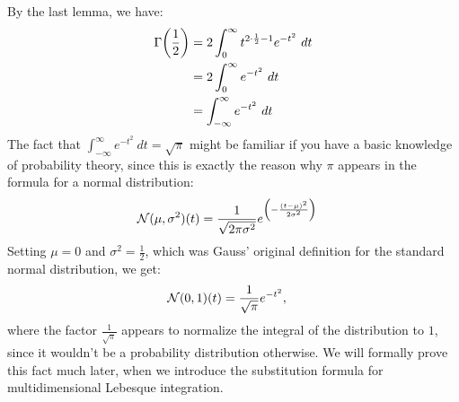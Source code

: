 \begin{proofsketch}
	By the last lemma, we have:
	\begin{align*}
		\Gamma\qty(\frac{1}{2}) &= 2\int_{0}^\infty t^{2 \cdot \frac{1}{2} - 1} e^{-t^2} ~dt\\
		&= 2\int_{0}^{\infty} e^{-t^2} ~dt\\
		&= \int_{-\infty}^{\infty} e^{-t^2} ~dt
	\end{align*}
	The fact that $\int_{-\infty}^{\infty} e^{-t^2} ~dt = \sqrt{\pi}$ might be familiar if you have a basic knowledge of probability theory, since this is exactly the reason why $\pi$ appears in the formula for a normal distribution:
	\begin{align*}
		\mathcal{N}(\mu,\sigma^2)(t)
		&=
		\frac{1}{\sqrt{2\pi\sigma^2}} e^\qty(-\frac{(t-\mu)^2}{2\sigma^2})
	\end{align*}
	Setting $\mu = 0$ and $\sigma^2 = \frac{1}{2}$, which was Gauss' original definition for the standard normal distribution, we get:
	\begin{align*}
		\mathcal{N}(0,1)(t)
		&=
		\frac{1}{\sqrt{\pi}} e^{-t^2},
	\end{align*}
	where the factor $\frac{1}{\sqrt{\pi}}$ appears to normalize the integral of the distribution to $1$, since it wouldn't be a probability distribution otherwise.
	\newpar
	We will formally prove this fact much later, when we introduce the substitution formula for multidimensional Lebesque integration.
\end{proofsketch}